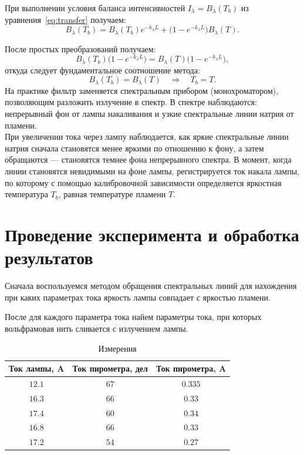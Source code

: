 \documentclass[12pt,a4paper]{article}
\begin{document}
При выполнении условия баланса интенсивностей $I_\lambda = B_\lambda(T_b)$ из уравнения~\eqref{eq:transfer} получаем:
\begin{equation}
B_\lambda(T_b) = B_\lambda(T_b) e^{-k_\lambda L} + \bigl(1 - e^{-k_\lambda L}\bigr) B_\lambda(T).
\end{equation}

После простых преобразований получаем:
\begin{equation}
B_\lambda(T_b)\bigl(1 - e^{-k_\lambda L}\bigr) = B_\lambda(T)\bigl(1 - e^{-k_\lambda L}\bigr),
\end{equation}
откуда следует фундаментальное соотношение метода:
\begin{equation}
B_\lambda(T_b) = B_\lambda(T) \quad \Rightarrow \quad T_b = T.
\label{eq:main}
\end{equation}
На практике фильтр заменяется спектральным прибором (монохроматором), позволяющим разложить излучение в спектр. В спектре наблюдаются: непрерывный фон от лампы накаливания и узкие спектральные линии натрия от пламени.\\
При увеличении тока через лампу наблюдается, как яркие спектральные линии натрия сначала становятся менее яркими по отношению к фону, а затем обращаются --- становятся темнее фона непрерывного спектра. В момент, когда линии становятся невидимыми на фоне лампы, регистрируется ток накала лампы, по которому с помощью калибровочной зависимости определяется яркостная температура $T_b$, равная температуре пламени $T$.




\section{ Проведение эксперимента и обработка результатов}
Сначала воспользуемся методом обращения спектральных линий для нахождения при каких параметрах тока яркость лампы совпадает с яркостью пламени.

После для каждого параметра тока найем параметры тока, при которых вольфрамовая нить сливается с излучением лампы.

\begin{table}[h]
\centering
\caption{Измерения}
\begin{tabular}{|c|c|c|}
\hline
\textbf{Ток лампы, A} & \textbf{Ток пирометра, дел} & \textbf{Ток пирометра, A} \\\hline
$12.1$   & $67$ & $0.335$ \\\hline
$16.3$   & $66$ & $0.33$ \\\hline
$17.4$   & $60$ & $0.34$ \\\hline
$16.8$   & $66$ & $0.33$ \\\hline
$17.2$   & $54$ & $0.27$ \\\hline
\end{tabular}
\end{table}
\end{document}
